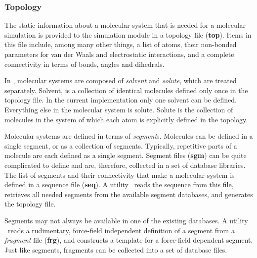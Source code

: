\subsubsection{Topology}
\label{topology}
The static information about a molecular system that is needed for
a molecular simulation is provided to the simulation module in a
topology file ({\bf top}). 
Items in this file include, among many other things, 
a list of atoms, their non-bonded parameters for van der Waals and
electrostatic interactions, and a complete connectivity in terms
of bonds, angles and dihedrals.
\par
In \nwargos, molecular systems are composed of {\it solvent} and 
{\it solute}, which are treated separately. Solvent, is a collection 
of identical molecules defined only once in the topology file. In the
current implementation only one solvent can be defined. Everything
else in the molecular system is solute. Solute is the collection of
molecules in the system of which each atom is explicitly defined in
the topology. 
\par
Molecular systems are defined in terms of {\it segment}s. Molecules
can be defined in a single segment, or as a collection of segments.
Typically, repetitive parts of a molecule are each defined as a single
segment. Segment files ({\bf sgm}) can be quite complicated to define 
and are, therefore, collected in a set of database libraries. 
The list of segments and their connectivity that make a molecular system 
is defined in a sequence file ({\bf seq}). 
A utility \nwtop\ reads the sequence from this file, retrieves all 
needed segments from the available segment databases, and generates the
topology file.
\par
Segments may not always be available in one of the existing databases.
A utility \nwsgm\ reads a rudimentary, force-field independent
definition of a segment from a {\it fragment} file ({\bf frg}), and 
constructs a template for a force-field dependent segment. 
Just like segments, fragments can be collected into a set of database files.

